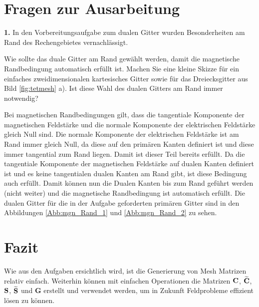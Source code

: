 \documentclass[Protokollheft.tex]{subfiles}
\begin{document}
\section{Fragen zur Ausarbeitung}

\begin{framed}
	\noindent \textbf{1.} In den Vorbereitungsaufgabe zum dualen Gitter wurden
Besonderheiten am Rand des Rechengebietes vernachlässigt.

Wie sollte das duale Gitter am Rand gewählt werden, damit die magnetische
Randbedingung automatisch erfüllt ist. Machen Sie eine kleine Skizze
für ein einfaches zweidimensionalen kartesisches Gitter sowie für
das Dreiecksgitter aus Bild \ref{fig:tetmesh} a). Ist diese Wahl
des dualen Gitters am Rand immer notwendig?\label{exer:autoHomNeumann}
\end{framed}
\noindent
Bei magnetischen Randbedingungen gilt, dass die tangentiale Komponente der magnetischen Feldstärke und die normale Komponente der elektrischen Feldstärke gleich Null sind. Die normale Komponente der elektrischen Feldstärke ist am Rand immer gleich Null, da diese auf den primären Kanten definiert ist und diese immer tangential zum Rand liegen. Damit ist dieser Teil bereits erfüllt. Da die tangentiale Komponente der magnetischen Feldstärke auf dualen Kanten definiert ist und es keine tangentialen dualen Kanten am Rand gibt, ist diese Bedingung auch erfüllt. Damit können nun die Dualen Kanten bis zum Rand geführt werden (nicht weiter) und die magnetische Randbedingung ist automatisch erfüllt. Die dualen Gitter für die in der Aufgabe geforderten primären Gitter sind in den Abbildungen \ref{Abb:mgn_Rand_1} und \ref{Abb:mgn_Rand_2} zu sehen.

\section{Fazit}
Wie aus den Aufgaben ersichtlich wird, ist die Generierung von Mesh Matrizen relativ einfach. Weiterhin können mit einfachen Operationen die Matrizen $\mathbf{C}$, $\widetilde{\mathbf{C}}$, $\mathbf{S}$, $\widetilde{\mathbf{S}}$ und $\mathbf{G}$ erstellt und verwendet werden, um in Zukunft Feldprobleme effizient lösen zu können. 

\clearpage
\end{document}
